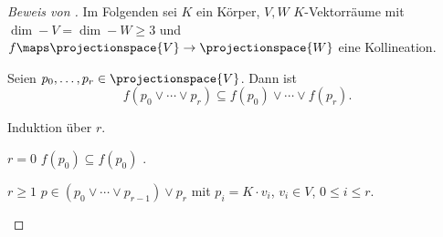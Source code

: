 \begin{proof}[Beweis von ]
  Im Folgenden sei \( K \) ein Körper, \( V,W \) \( K \)-Vektorräume mit \( \dim-{}{V}=\dim-{}{W}\geq 3 \) und \( f\maps \projectionspace{V}\to \projectionspace{W} \) eine Kollineation.
  \begin{lemma}\label{kollineation_erhaelt_verbindungsraum}
    Seien \( p_0,\dotsc,p_r\in \projectionspace{V} \). Dann ist
    \begin{equation*}
      f(p_0 \vee \dotsb\vee p_r)\subseteq f(p_0)\vee \dotsb\vee f(p_r).
    \end{equation*}
  \end{lemma}
  \begin{subproof}
    Induktion über \( r \).
    \begin{proofdescription}
      \item[\( r=0 \)] \( f(p_0)\subseteq f(p_0) \) \checkmark.
      \item[\( r\geq 1 \)] \( p\in (p_0\vee \dotsb\vee p_{r-1})\vee p_r \) mit \( p_i=K\cdot v_i \), \( v_i\in V \), \( 0\leq i\leq r \). 


\end{proofdescription}
\end{subproof}
\end{proof}
